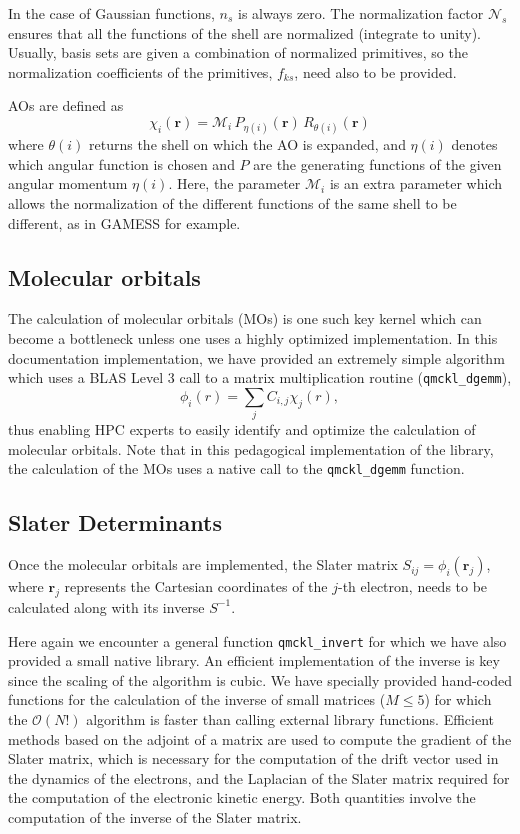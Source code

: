 In the case of Gaussian functions, $n_s$ is always zero.  The
normalization factor $\mathcal{N}_s$ ensures that all the functions of
the shell are normalized (integrate to unity). Usually, basis sets are
given a combination of normalized primitives, so the normalization
coefficients of the primitives, $f_{ks}$, need also to be provided.

\acp{AO} are defined as
\[
\chi_i (\mathbf{r}) = \mathcal{M}_i\, P_{\eta(i)}(\mathbf{r})\, R_{\theta(i)} (\mathbf{r})
\] 
where $\theta(i)$ returns the shell on which the \ac{AO} is expanded, and
$\eta(i)$ denotes which angular function is chosen and $P$ are the
generating functions of the given angular momentum $\eta(i)$.  Here,
the parameter $\mathcal{M}_i$ is an extra parameter which allows the
normalization of the different functions of the same shell to be
different, as in GAMESS for example.


\subsection{Molecular orbitals}

The calculation of molecular orbitals (MOs) is one such key kernel which can
become a bottleneck unless one uses a highly optimized implementation.
In this documentation implementation, we have provided an extremely simple
algorithm which uses a \ac{BLAS} Level 3 call to a matrix multiplication
routine (\texttt{qmckl_dgemm}),
\[
  \phi_i(r) = \sum_{j}C_{i,j}\chi_j(r),
    \label{eq:mos}
\]
thus enabling \ac{HPC} experts to easily identify and optimize the calculation
of molecular orbitals. Note that in this pedagogical implementation of the
library, the calculation of the \acp{MO} uses a native call to the
\texttt{qmckl_dgemm} function.

\subsection{Slater Determinants}

Once the molecular orbitals are implemented, the Slater matrix $S_{ij} = \phi_i(\mathbf{r}_j)$,
where $\mathbf{r}_j$ represents the Cartesian coordinates of the $j$-th electron, needs to be
calculated along with its inverse $S^{-1}$.
  
Here again we encounter a general  function
\texttt{qmckl_invert} for which we have also provided a small native
library. An efficient implementation of the inverse is key since the 
scaling of the algorithm is cubic. We have specially provided hand-coded functions for
the calculation of the inverse of small matrices ($M\le 5$) for which the
$\mathcal{O}(N!)$ algorithm is faster than calling external library functions.
Efficient methods based on the adjoint of a matrix \cite{MCMQC} are used to
compute the gradient of the Slater matrix, which is necessary for the 
computation of the drift vector used in the dynamics of the
electrons, and the Laplacian of the Slater matrix required for the computation of
the electronic kinetic energy. Both quantities involve the computation of
the inverse of the Slater matrix.

